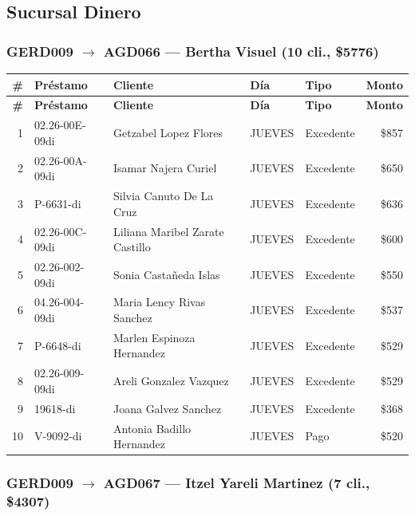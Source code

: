 \documentclass[11pt,a4paper]{article}
\newcommand{\money}[1]{\$\num{#1}}
\begin{document}
\subsection{Sucursal Dinero}

\subsubsection{GERD009 $\rightarrow$ AGD066 --- Bertha Visuel (10 cli., \money{5776})}


\begin{center}
\renewcommand{\arraystretch}{1.1}
\footnotesize
\begin{longtable}{rlp{5.5cm}llr}
\toprule
\textbf{\#} & \textbf{Pr\'estamo} & \textbf{Cliente} & \textbf{D\'ia} & \textbf{Tipo} & \textbf{Monto} \\
\midrule
\endfirsthead
\toprule
\textbf{\#} & \textbf{Pr\'estamo} & \textbf{Cliente} & \textbf{D\'ia} & \textbf{Tipo} & \textbf{Monto} \\
\midrule
\endhead
1 & 02.26-00E-09di & Getzabel Lopez Flores & JUEVES & Excedente & \money{857} \\
2 & 02.26-00A-09di & Isamar Najera Curiel & JUEVES & Excedente & \money{650} \\
3 & P-6631-di & Silvia Canuto De La Cruz & JUEVES & Excedente & \money{636} \\
4 & 02.26-00C-09di & Liliana Maribel Zarate Castillo & JUEVES & Excedente & \money{600} \\
5 & 02.26-002-09di & Sonia Castañeda Islas & JUEVES & Excedente & \money{550} \\
6 & 04.26-004-09di & Maria Lency Rivas Sanchez & JUEVES & Excedente & \money{537} \\
7 & P-6648-di & Marlen Espinoza Hernandez & JUEVES & Excedente & \money{529} \\
8 & 02.26-009-09di & Areli Gonzalez Vazquez & JUEVES & Excedente & \money{529} \\
9 & 19618-di & Joana Galvez Sanchez & JUEVES & Excedente & \money{368} \\
10 & V-9092-di & Antonia Badillo Hernandez & JUEVES & Pago & \money{520} \\

\bottomrule
\end{longtable}
\end{center}
\subsubsection{GERD009 $\rightarrow$ AGD067 --- Itzel Yareli Martinez (7 cli., \money{4307})}
\end{document}
